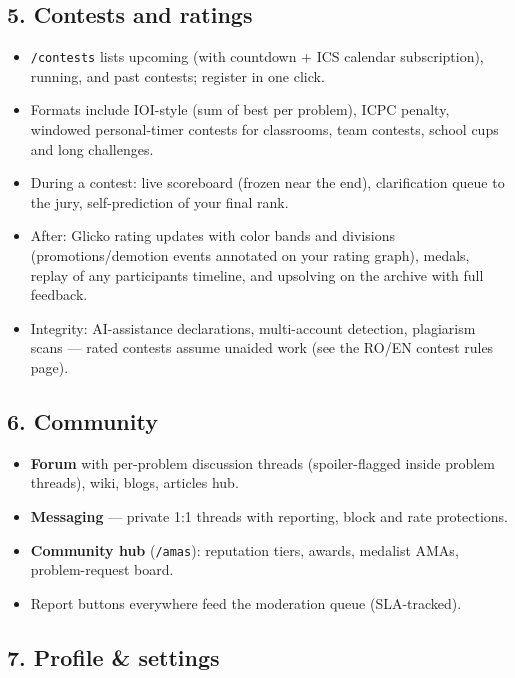 \documentclass[
]{article}
\providecommand{\tightlist}{%
  \setlength{\itemsep}{0pt}\setlength{\parskip}{0pt}}
\begin{document}
\subsection{5. Contests and ratings}\label{5-contests-and-ratings}

\begin{itemize}
\tightlist
\item
  \texttt{/contests} lists upcoming (with countdown + ICS calendar
  subscription), running, and past contests; register in one click.
\item
  Formats include IOI-style (sum of best per problem), ICPC penalty,
  windowed personal-timer contests for classrooms, team contests, school
  cups and long challenges.
\item
  During a contest: live scoreboard (frozen near the end), clarification
  queue to the jury, self-prediction of your final rank.
\item
  After: Glicko rating updates with color bands and divisions
  (promotions/demotion events annotated on your rating graph), medals,
  replay of any participant\textquotesingle s timeline, and upsolving on
  the archive with full feedback.
\item
  Integrity: AI-assistance declarations, multi-account detection,
  plagiarism scans --- rated contests assume unaided work (see the RO/EN
  contest rules page).
\end{itemize}

\subsection{6. Community}\label{6-community}

\begin{itemize}
\tightlist
\item
  \textbf{Forum} with per-problem discussion threads (spoiler-flagged
  inside problem threads), wiki, blogs, articles hub.
\item
  \textbf{Messaging} --- private 1:1 threads with reporting, block and
  rate protections.
\item
  \textbf{Community hub} (\texttt{/amas}): reputation tiers, awards,
  medalist AMAs, problem-request board.
\item
  Report buttons everywhere feed the moderation queue (SLA-tracked).
\end{itemize}

\subsection{7. Profile \& settings}\label{7-profile--settings}
\end{document}
